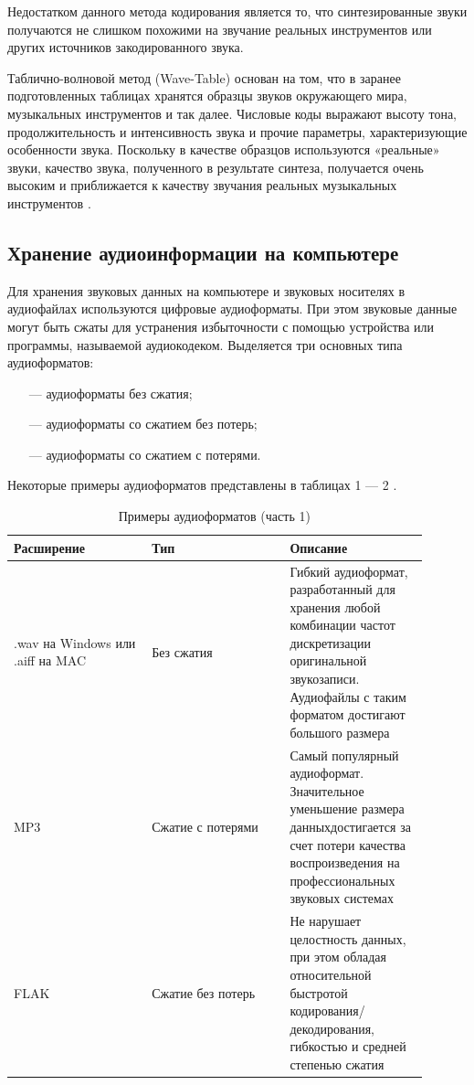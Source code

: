 Недостатком данного метода кодирования является то, что синтезированные звуки получаются не слишком похожими на звучание реальных инструментов или других источников закодированного звука.

Таблично-волновой метод (Wave-Table) основан на том, что в заранее подготовленных таблицах хранятся образцы звуков окружающего мира, музыкальных инструментов и так далее. Числовые коды выражают высоту тона, продолжительность и интенсивность звука и прочие параметры, характеризующие особенности звука. Поскольку в качестве образцов используются «реальные» звуки, качество звука, полученного в результате синтеза, получается очень высоким и приближается к качеству звучания реальных музыкальных инструментов \cite{TypesofSynthesis}.

\subsection{Хранение аудиоинформации на компьютере}
Для хранения звуковых данных на компьютере и звуковых носителях в аудиофайлах используются цифровые аудиоформаты. При этом звуковые данные могут быть сжаты для устранения избыточности с помощью устройства или программы, называемой аудиокодеком. Выделяется три основных типа аудиоформатов:
\begin{itemize}
	\item[---]  аудиоформаты без сжатия;
	\item[---]  аудиоформаты со сжатием без потерь;
	\item[---]  аудиоформаты со сжатием с потерями.
\end{itemize}

Некоторые примеры аудиоформатов представлены в таблицах 1 --- 2 \cite{AudioFormats}.

\begin{table}[H]
\caption{Примеры аудиоформатов (часть 1)}
\begin{center}
\begin{tabular}{|p{0.3\linewidth}|p{0.3\linewidth}|p{0.3\linewidth}|}
		\hline
		Расширение & Тип & Описание \\ [0.5ex] 
 		\hline
		 .wav на Windows или .aiff на MAC & Без сжатия & Гибкий аудиоформат, разработанный для хранения любой комбинации частот дискретизации оригинальной звукозаписи. Аудиофайлы с таким форматом достигают большого размера\\
 		\hline MP3 & Сжатие с потерями & Самый популярный аудиоформат. Значительное уменьшение размера данных\linebreak достигается за счет потери качества воспроизведения на профессиональных звуковых системах\\
 		\hline
 		FLAK & Сжатие без потерь & Не нарушает целостность данных, при этом обладая относительной быстротой кодирования/декодирования, гибкостью и средней степенью сжатия\\
		\hline
\end{tabular}
\end{center}
\end{table}

